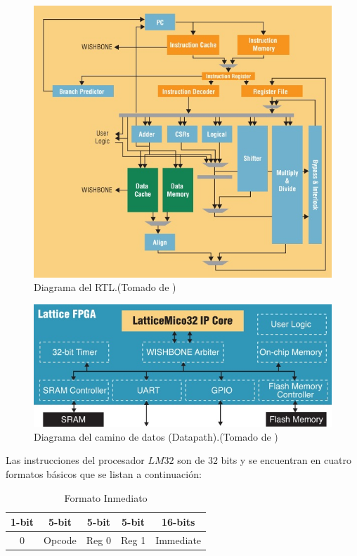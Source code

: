 \documentclass[twocolumn]{IEEEtran}
\begin{document}
\begin{figure}[H]
	\centering
		\includegraphics[scale=0.5]{RTL2_LM32.jpeg}
	\caption{Diagrama del RTL.(Tomado de \cite{page1})}
	\label{fig2}
\end{figure}
\begin{figure}[H]
	\centering
		\includegraphics[scale=0.5]{RTL_LM32.jpeg}
	\caption{Diagrama del camino de datos (Datapath).(Tomado de \cite{page1})}
	\label{fig3}
\end{figure}
\noindent
Las instrucciones del  procesador $LM32$ son de $32$ bits y se encuentran  en cuatro formatos básicos que se listan a continuación:
\begin{table}[H]
	\centering
\begin{tabular}[c]{|c|c|c|c|c|} \hline
\textbf{1-bit} & \textbf{5-bit} & \textbf{5-bit} & \textbf{5-bit} & \textbf{16-bits} \\ \hline
0 & Opcode & Reg 0 & Reg 1 & Immediate \\ \hline
\end{tabular}
	\caption{Formato Inmediato}
	\label{tab1}
\end{table}
\end{document}

